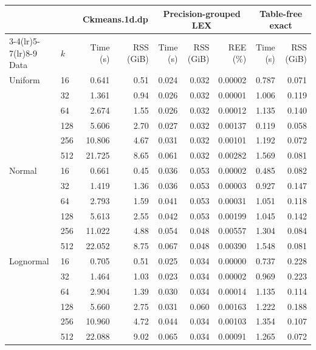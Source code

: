 \setlength{\tabcolsep}{5.5pt}
\begin{tabular}{@{}ll rr rrr rr@{}}
\toprule
 &  & \multicolumn{2}{c}{Ckmeans.1d.dp} & \multicolumn{3}{c}{Precision-grouped LEX} & \multicolumn{2}{c}{Table-free exact} \\
\cmidrule(lr){3-4}\cmidrule(lr){5-7}\cmidrule(lr){8-9}
Data & $k$ & Time (s) & RSS (GiB) & Time (s) & RSS (GiB) & REE (\%) & Time (s) & RSS (GiB) \\
\midrule
Uniform & 16 & 0.641 & 0.51 & 0.024 & 0.032 & 0.00002 & 0.787 & 0.071 \\
 & 32 & 1.361 & 0.94 & 0.026 & 0.032 & 0.00001 & 1.006 & 0.119 \\
 & 64 & 2.674 & 1.55 & 0.026 & 0.032 & 0.00012 & 1.135 & 0.140 \\
 & 128 & 5.606 & 2.70 & 0.027 & 0.032 & 0.00137 & 0.119 & 0.058 \\
 & 256 & 10.806 & 4.67 & 0.031 & 0.032 & 0.00101 & 1.192 & 0.072 \\
 & 512 & 21.725 & 8.65 & 0.061 & 0.032 & 0.00282 & 1.569 & 0.081 \\
\addlinespace
Normal & 16 & 0.661 & 0.45 & 0.036 & 0.053 & 0.00002 & 0.485 & 0.082 \\
 & 32 & 1.419 & 1.36 & 0.036 & 0.053 & 0.00003 & 0.927 & 0.147 \\
 & 64 & 2.793 & 1.59 & 0.041 & 0.053 & 0.00031 & 1.051 & 0.118 \\
 & 128 & 5.613 & 2.55 & 0.042 & 0.053 & 0.00199 & 1.045 & 0.142 \\
 & 256 & 11.022 & 4.88 & 0.054 & 0.048 & 0.00557 & 1.304 & 0.084 \\
 & 512 & 22.052 & 8.75 & 0.067 & 0.048 & 0.00390 & 1.548 & 0.081 \\
\addlinespace
Lognormal & 16 & 0.705 & 0.51 & 0.025 & 0.034 & 0.00000 & 0.737 & 0.228 \\
 & 32 & 1.464 & 1.03 & 0.023 & 0.034 & 0.00002 & 0.969 & 0.223 \\
 & 64 & 2.904 & 1.39 & 0.030 & 0.034 & 0.00014 & 1.135 & 0.114 \\
 & 128 & 5.660 & 2.75 & 0.031 & 0.060 & 0.00163 & 1.222 & 0.188 \\
 & 256 & 10.960 & 4.72 & 0.044 & 0.034 & 0.00103 & 1.354 & 0.107 \\
 & 512 & 22.088 & 9.02 & 0.065 & 0.034 & 0.00091 & 1.265 & 0.072 \\
\bottomrule
\end{tabular}
